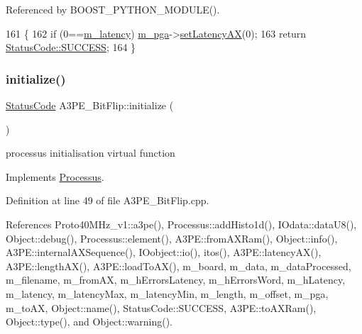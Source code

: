 Referenced by B\+O\+O\+S\+T\+\_\+\+P\+Y\+T\+H\+O\+N\+\_\+\+M\+O\+D\+U\+L\+E().


\begin{DoxyCode}
161                                     \{
162   \textcolor{keywordflow}{if} (0==\hyperlink{classA3PE__BitFlip_a6f5ad1d6595e98c2fbd58f43e2754322}{m\_latency}) \hyperlink{classA3PE__BitFlip_ad20d7abccf27fa87b931cb77cd6b5e41}{m\_pga}->\hyperlink{classA3PE_a53882e1272e8146e51837904ea00f33c}{setLatencyAX}(0);
163   \textcolor{keywordflow}{return} \hyperlink{classStatusCode_a6f565cbeadc76d14c72f047e5e85eb4badd0da38d3ba0d922efd1f4619bc37ad8}{StatusCode::SUCCESS};
164 \}
\end{DoxyCode}
\mbox{\label{classA3PE__BitFlip_a88dc6cfe690a518e38ff6d89026e6e0c}} 
\subsubsection{\texorpdfstring{initialize()}{initialize()}}
{\footnotesize\ttfamily \hyperlink{classStatusCode}{Status\+Code} A3\+P\+E\+\_\+\+Bit\+Flip\+::initialize (\begin{DoxyParamCaption}{ }\end{DoxyParamCaption})\hspace{0.3cm}{\ttfamily [virtual]}}

processus initialisation virtual function 

Implements \hyperlink{classProcessus_aee88ad7b77ae7319cf8b128e9dd2ea11}{Processus}.



Definition at line 49 of file A3\+P\+E\+\_\+\+Bit\+Flip.\+cpp.



References Proto40\+M\+Hz\+\_\+v1\+::a3pe(), Processus\+::add\+Histo1d(), I\+Odata\+::data\+U8(), Object\+::debug(), Processus\+::element(), A3\+P\+E\+::from\+A\+X\+Ram(), Object\+::info(), A3\+P\+E\+::internal\+A\+X\+Sequence(), I\+Oobject\+::io(), itos(), A3\+P\+E\+::latency\+A\+X(), A3\+P\+E\+::length\+A\+X(), A3\+P\+E\+::load\+To\+A\+X(), m\+\_\+board, m\+\_\+data, m\+\_\+data\+Processed, m\+\_\+filename, m\+\_\+from\+AX, m\+\_\+h\+Errors\+Latency, m\+\_\+h\+Errors\+Word, m\+\_\+h\+Latency, m\+\_\+latency, m\+\_\+latency\+Max, m\+\_\+latency\+Min, m\+\_\+length, m\+\_\+offset, m\+\_\+pga, m\+\_\+to\+AX, Object\+::name(), Status\+Code\+::\+S\+U\+C\+C\+E\+SS, A3\+P\+E\+::to\+A\+X\+Ram(), Object\+::type(), and Object\+::warning().



